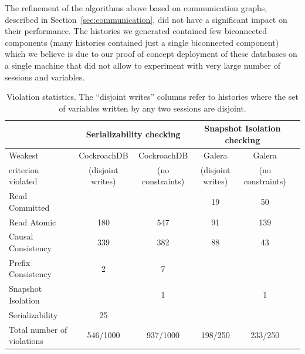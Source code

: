 
The refinement of the algorithms above based on communication graphs, described in Section~\ref{sec:communication}, did not have a significant impact on their performance. The histories we generated contained few biconnected components (many histories contained just a single biconnected component) which we believe is due to our proof of concept deployment of these databases on a single machine that did not allow to experiment with very large number of sessions and variables. 


\begin{table}
\caption{Violation statistics. The ``disjoint writes'' columns refer to histories where the set of variables written by any two sessions are disjoint.}
\small{
 \begin{tabular}{|l|c|c|c|c|c|}
  \hline
  & \multicolumn{2}{c|}{Serializability checking} & \multicolumn{2}{c|}{Snapshot Isolation checking} \\
  \hline
  Weakest                  & CockroachDB     & CockroachDB     & Galera      & Galera                \\
  criterion violated         & (disjoint writes) & (no constraints) & (disjoint writes) & (no constraints)  \\
  \hline
  Read Committed     &             &             & 19          & 50              \\
  Read Atomic        & 180         & 547         & 91          & 139                \\
  Causal Consistency            & 339         & 382         & 88          & 43                  \\
  Prefix Consistency            & 2           & 7           &             &                    \\
  Snapshot Isolation &             & 1           &             & 1                   \\
  Serializability      & 25          &             &            &                     \\
  \hline
  \hline
  Total number of violations           & 546/1000        & 937/1000        & 198/250         & 233/250              \\
  \hline
 \end{tabular}
 }
 \label{violation_stat}
\end{table}

